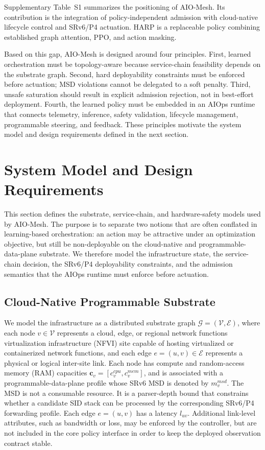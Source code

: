 \documentclass[final,5p]{elsarticle}
\newcommand{\rev}[1]{\textcolor{revisiongreen}{#1}}
\let\newrev\rev
\begin{document}
Supplementary Table~S1 summarizes the positioning of AIO-Mesh. \rev{Its contribution is the integration of policy-independent admission with cloud-native lifecycle control and SRv6/P4 actuation. HARP is a replaceable policy combining established graph attention, PPO, and action masking.}

Based on this gap, AIO-Mesh is designed around four principles. First, learned orchestration must be topology-aware because service-chain feasibility depends on the substrate graph. Second, hard deployability constraints must be enforced before actuation; MSD violations cannot be delegated to a soft penalty. Third, unsafe saturation should result in explicit admission rejection, not in best-effort deployment. Fourth, the learned policy must be embedded in an AIOps runtime that connects telemetry, inference, safety validation, lifecycle management, programmable steering, and feedback. These principles motivate the system model and design requirements defined in the next section.

\section{System Model and Design Requirements}
\label{sec:system_model}

This section defines the substrate, service-chain, and hardware-safety models used by AIO-Mesh. The purpose is to separate two notions that are often conflated in learning-based orchestration: an action may be attractive under an optimization objective, but still be non-deployable on the cloud-native and programmable-data-plane substrate. We therefore model the infrastructure state, the service-chain decision, the SRv6/P4 deployability constraints, and the admission semantics that the AIOps runtime must enforce before actuation.

\subsection{Cloud-Native Programmable Substrate}
\label{subsec:infrastructure_model}

We model the infrastructure as a distributed substrate graph $\mathcal{G}=(\mathcal{V},\mathcal{E})$, where each node \(v\in\mathcal{V}\) represents a cloud, edge, or regional \newrev{network functions virtualization infrastructure (NFVI)} site capable of hosting virtualized or containerized network functions, and each edge \(e=(u,v)\in\mathcal{E}\) represents a physical or logical inter-site link. Each node has compute and \newrev{random-access memory (RAM)} capacities $\mathbf{c}_v=\left[c_v^{cpu},c_v^{mem}\right]$, and is associated with a programmable-data-plane profile whose SRv6 \rev{MSD} is denoted by \(m_v^{msd}\). The MSD is not a consumable resource. It is a parser-depth bound that constrains whether a candidate SID stack can be processed by the corresponding SRv6/P4 forwarding profile. Each edge \(e=(u,v)\) has a latency \(l_{uv}\). Additional link-level attributes, such as bandwidth or loss, may be enforced by the controller, but are not included in the core policy interface in order to keep the deployed observation contract stable.
\end{document}
